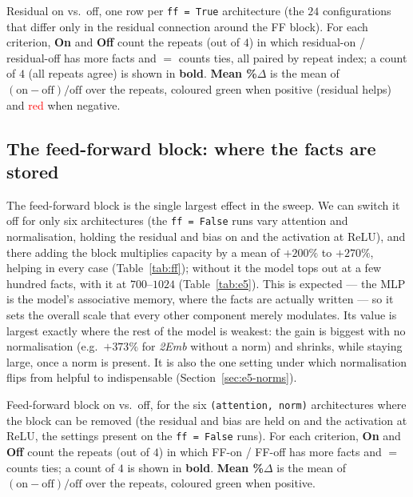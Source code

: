 \documentclass[11pt,a4paper]{article}
\begin{document}
\begin{table}[ht]
\footnotesize
\setlength{\tabcolsep}{4pt}
\begin{adjustwidth}{-1.5cm}{-1.5cm}
\centering

\end{adjustwidth}
\caption{Residual on vs.\ off, one row per \texttt{ff = True} architecture (the $24$ configurations that differ only in the residual connection around the FF block). For each criterion, \textbf{On} and \textbf{Off} count the repeats (out of $4$) in which residual-on / residual-off has more facts and \textbf{$=$} counts ties, all paired by repeat index; a count of $4$ (all repeats agree) is shown in \textbf{bold}. \textbf{Mean \%$\Delta$} is the mean of $(\text{on}-\text{off})/\text{off}$ over the repeats, coloured \textcolor{green!55!black}{green} when positive (residual helps) and \textcolor{red}{red} when negative.}
\label{tab:residual}
\end{table}

\subsection{The feed-forward block: where the facts are stored}

The feed-forward block is the single largest effect in the sweep. We can switch it off for only six architectures (the \texttt{ff = False} runs vary attention and normalisation, holding the residual and bias on and the activation at ReLU), and there adding the block multiplies capacity by a mean of $+200\%$ to $+270\%$, helping in every case (Table~\ref{tab:ff}); without it the model tops out at a few hundred facts, with it at $700$--$1024$ (Table~\ref{tab:e5}). This is expected --- the MLP is the model's associative memory, where the facts are actually written --- so it sets the overall scale that every other component merely modulates. Its value is largest exactly where the rest of the model is weakest: the gain is biggest with no normalisation (e.g.\ $+373\%$ for \emph{2Emb} without a norm) and shrinks, while staying large, once a norm is present. It is also the one setting under which normalisation flips from helpful to indispensable (Section~\ref{sec:e5-norms}).

\begin{table}[ht]
\centering

\caption{Feed-forward block on vs.\ off, for the six \texttt{(attention, norm)} architectures where the block can be removed (the residual and bias are held on and the activation at ReLU, the settings present on the \texttt{ff = False} runs). For each criterion, \textbf{On} and \textbf{Off} count the repeats (out of $4$) in which FF-on / FF-off has more facts and \textbf{$=$} counts ties; a count of $4$ is shown in \textbf{bold}. \textbf{Mean \%$\Delta$} is the mean of $(\text{on}-\text{off})/\text{off}$ over the repeats, coloured \textcolor{green!55!black}{green} when positive.}
\label{tab:ff}
\end{table}
\end{document}
